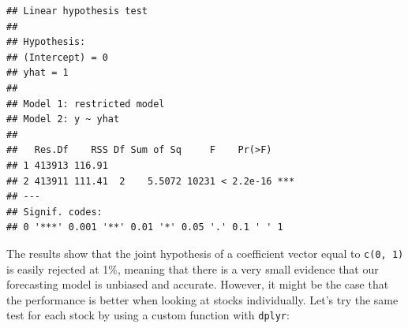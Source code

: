 \documentclass[11pt,]{book}
\newenvironment{Shaded}{\begin{snugshade}}{\end{snugshade}}
\newcommand{\KeywordTok}[1]{\textcolor[rgb]{0.27,0.27,0.27}{\textbf{#1}}}
\newcommand{\DataTypeTok}[1]{\textcolor[rgb]{0.27,0.27,0.27}{#1}}
\newcommand{\DecValTok}[1]{\textcolor[rgb]{0.06,0.06,0.06}{#1}}
\newcommand{\StringTok}[1]{\textcolor[rgb]{0.5,0.5,0.5}{#1}}
\newcommand{\CommentTok}[1]{\textcolor[rgb]{0.56,0.35,0.01}{\textit{#1}}}
\newcommand{\ControlFlowTok}[1]{\textcolor[rgb]{0.13,0.29,0.53}{\textbf{#1}}}
\newcommand{\OperatorTok}[1]{\textcolor[rgb]{0.81,0.36,0.00}{\textbf{#1}}}
\newcommand{\NormalTok}[1]{#1}
\begin{document}
\begin{verbatim}
## Linear hypothesis test
## 
## Hypothesis:
## (Intercept) = 0
## yhat = 1
## 
## Model 1: restricted model
## Model 2: y ~ yhat
## 
##   Res.Df    RSS Df Sum of Sq     F    Pr(>F)    
## 1 413913 116.91                                 
## 2 413911 111.41  2    5.5072 10231 < 2.2e-16 ***
## ---
## Signif. codes:  
## 0 '***' 0.001 '**' 0.01 '*' 0.05 '.' 0.1 ' ' 1
\end{verbatim}

The results show that the joint hypothesis of a coefficient vector equal
to \texttt{c(0,\ 1)} is easily rejected at 1\%, meaning that there is a
very small evidence that our forecasting model is unbiased and accurate.
However, it might be the case that the performance is better when
looking at stocks individually. Let's try the same test for each stock
by using a custom function with \texttt{dplyr}: 

\begin{Shaded}
\end{Shaded}
\end{document}
